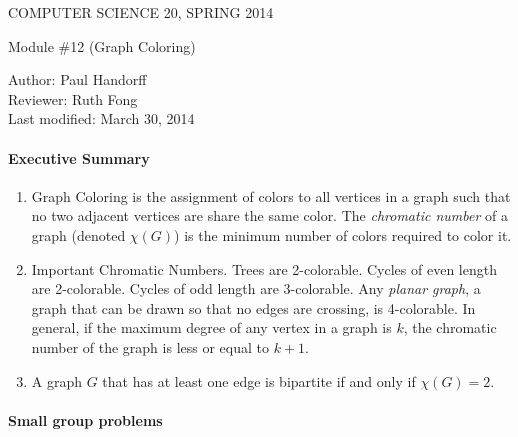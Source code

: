 \documentclass[12pt]{article}
\begin{document}
\begin{center}
COMPUTER SCIENCE 20, SPRING 2014 \\

\smallskip

Module \#12 (Graph Coloring)
\end{center}
Author: Paul Handorff\\
Reviewer: Ruth Fong \\
Last modified: March 30, 2014

\medskip

\paragraph*{Executive Summary}
\begin{enumerate}

\item Graph Coloring is the assignment of colors to all vertices in a graph such that no two adjacent vertices are share the same color. The \emph{chromatic number} of a graph (denoted $\chi(G)$) is the minimum number of colors required to color it.  

\item Important Chromatic Numbers. Trees are 2-colorable. Cycles of even length are 2-colorable. Cycles of odd length are 3-colorable. Any \emph{planar graph}, a graph that can be drawn so that no edges are crossing, is 4-colorable. In general, if the maximum degree of any vertex in a graph is $k$, the chromatic number of the graph is less or equal to $k+1$.

\item A graph $G$ that has at least one edge is bipartite if and only if $\chi(G) = 2$.
\end{enumerate}

\paragraph*{Small group problems}
\end{document}

